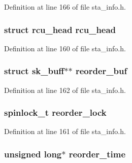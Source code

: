 Definition at line 166 of file sta\-\_\-info.\-h.

\hypertarget{structtid__ampdu__rx_ab698383409a24791490f962fe6990655}{
\subsubsection[{rcu\-\_\-head}]{\setlength{\rightskip}{0pt plus 5cm}struct rcu\-\_\-head rcu\-\_\-head}}\label{structtid__ampdu__rx_ab698383409a24791490f962fe6990655}


Definition at line 160 of file sta\-\_\-info.\-h.

\hypertarget{structtid__ampdu__rx_a271b63a3f29606b2e6eb7242449573fa}{
\subsubsection[{reorder\-\_\-buf}]{\setlength{\rightskip}{0pt plus 5cm}struct sk\-\_\-buff$\ast$$\ast$ reorder\-\_\-buf}}\label{structtid__ampdu__rx_a271b63a3f29606b2e6eb7242449573fa}


Definition at line 162 of file sta\-\_\-info.\-h.

\hypertarget{structtid__ampdu__rx_a60a5d0df4d272ca8f03273796f2f9abb}{
\subsubsection[{reorder\-\_\-lock}]{\setlength{\rightskip}{0pt plus 5cm}spinlock\-\_\-t reorder\-\_\-lock}}\label{structtid__ampdu__rx_a60a5d0df4d272ca8f03273796f2f9abb}


Definition at line 161 of file sta\-\_\-info.\-h.

\hypertarget{structtid__ampdu__rx_a36ab2908090be3b171339cc81fe59f85}{
\subsubsection[{reorder\-\_\-time}]{\setlength{\rightskip}{0pt plus 5cm}unsigned long$\ast$ reorder\-\_\-time}}\label{structtid__ampdu__rx_a36ab2908090be3b171339cc81fe59f85}



